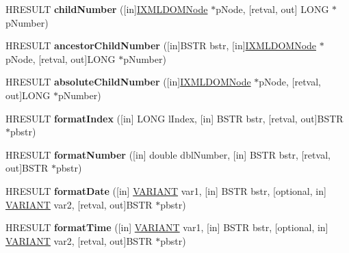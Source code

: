 \begin{DoxyCompactItemize}
H\+R\+E\+S\+U\+LT {\bfseries child\+Number} (\mbox{[}in\mbox{]}\hyperlink{interface_m_s_x_m_l2_1_1_i_x_m_l_d_o_m_node}{I\+X\+M\+L\+D\+O\+M\+Node} $\ast$p\+Node, \mbox{[}retval, out\mbox{]} L\+O\+NG $\ast$p\+Number)
\item 
\mbox{\label{interface_m_s_x_m_l2_1_1_i_x_t_l_runtime_ae6428ef5a67a02bd81bc38db2c9f18ed}} 
H\+R\+E\+S\+U\+LT {\bfseries ancestor\+Child\+Number} (\mbox{[}in\mbox{]}B\+S\+TR bstr, \mbox{[}in\mbox{]}\hyperlink{interface_m_s_x_m_l2_1_1_i_x_m_l_d_o_m_node}{I\+X\+M\+L\+D\+O\+M\+Node} $\ast$p\+Node, \mbox{[}retval, out\mbox{]}L\+O\+NG $\ast$p\+Number)
\item 
\mbox{\label{interface_m_s_x_m_l2_1_1_i_x_t_l_runtime_aa482dbe765de42edcb27b39e6f213d88}} 
H\+R\+E\+S\+U\+LT {\bfseries absolute\+Child\+Number} (\mbox{[}in\mbox{]}\hyperlink{interface_m_s_x_m_l2_1_1_i_x_m_l_d_o_m_node}{I\+X\+M\+L\+D\+O\+M\+Node} $\ast$p\+Node, \mbox{[}retval, out\mbox{]}L\+O\+NG $\ast$p\+Number)
\item 
\mbox{\label{interface_m_s_x_m_l2_1_1_i_x_t_l_runtime_abfe3c838af6b50fa8795438a4c3a5a9d}} 
H\+R\+E\+S\+U\+LT {\bfseries format\+Index} (\mbox{[}in\mbox{]} L\+O\+NG l\+Index, \mbox{[}in\mbox{]} B\+S\+TR bstr, \mbox{[}retval, out\mbox{]}B\+S\+TR $\ast$pbstr)
\item 
\mbox{\label{interface_m_s_x_m_l2_1_1_i_x_t_l_runtime_a0652b99a2d9e73069aa2a1a9035783c9}} 
H\+R\+E\+S\+U\+LT {\bfseries format\+Number} (\mbox{[}in\mbox{]} double dbl\+Number, \mbox{[}in\mbox{]} B\+S\+TR bstr, \mbox{[}retval, out\mbox{]}B\+S\+TR $\ast$pbstr)
\item 
\mbox{\label{interface_m_s_x_m_l2_1_1_i_x_t_l_runtime_a3529a40732e6f5b2377cf7ccd2b88f03}} 
H\+R\+E\+S\+U\+LT {\bfseries format\+Date} (\mbox{[}in\mbox{]} \hyperlink{structtag_v_a_r_i_a_n_t}{V\+A\+R\+I\+A\+NT} var1, \mbox{[}in\mbox{]} B\+S\+TR bstr, \mbox{[}optional, in\mbox{]} \hyperlink{structtag_v_a_r_i_a_n_t}{V\+A\+R\+I\+A\+NT} var2, \mbox{[}retval, out\mbox{]}B\+S\+TR $\ast$pbstr)
\item 
\mbox{\label{interface_m_s_x_m_l2_1_1_i_x_t_l_runtime_ad69be2ddb5c7a2cf6b2946a066ec802a}} 
H\+R\+E\+S\+U\+LT {\bfseries format\+Time} (\mbox{[}in\mbox{]} \hyperlink{structtag_v_a_r_i_a_n_t}{V\+A\+R\+I\+A\+NT} var1, \mbox{[}in\mbox{]} B\+S\+TR bstr, \mbox{[}optional, in\mbox{]} \hyperlink{structtag_v_a_r_i_a_n_t}{V\+A\+R\+I\+A\+NT} var2, \mbox{[}retval, out\mbox{]}B\+S\+TR $\ast$pbstr)
\end{DoxyCompactItemize}
